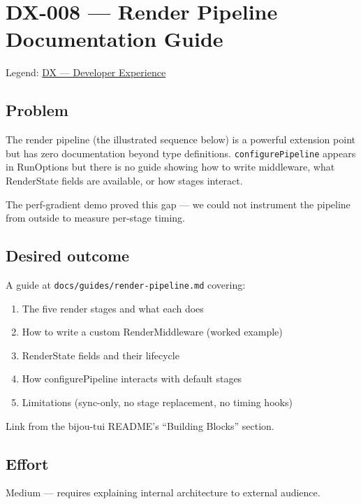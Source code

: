 \chapter{DX-008 --- Render Pipeline Documentation Guide}\label{record-311}

\smallskip

Legend: \href{https://github.com/flyingrobots/bijou/blob/cbd70612140e7a450d764b3c7be1c6af878b99bc/docs/method/graveyard/legends/DX-developer-experience.md}{DX --- Developer Experience}

\section{Problem}\label{record-311-problem}

The render pipeline (the illustrated sequence below) is a powerful extension point but has zero documentation beyond type definitions. \texttt{c\allowbreak{}o\allowbreak{}n\allowbreak{}f\allowbreak{}i\allowbreak{}g\allowbreak{}u\allowbreak{}r\allowbreak{}e\allowbreak{}P\allowbreak{}i\allowbreak{}p\allowbreak{}e\allowbreak{}l\allowbreak{}i\allowbreak{}n\allowbreak{}e} appears in RunOptions but there is no guide showing how to write middleware, what RenderState fields are available, or how stages interact.



The perf-gradient demo proved this gap --- we could not instrument the pipeline from outside to measure per-stage timing.

\section{Desired outcome}\label{record-311-desired-outcome}

A guide at \texttt{d\allowbreak{}o\allowbreak{}c\allowbreak{}s\allowbreak{}/\allowbreak{}g\allowbreak{}u\allowbreak{}i\allowbreak{}d\allowbreak{}e\allowbreak{}s\allowbreak{}/\allowbreak{}r\allowbreak{}e\allowbreak{}n\allowbreak{}d\allowbreak{}e\allowbreak{}r\allowbreak{}-\allowbreak{}p\allowbreak{}i\allowbreak{}p\allowbreak{}e\allowbreak{}l\allowbreak{}i\allowbreak{}n\allowbreak{}e\allowbreak{}.\allowbreak{}m\allowbreak{}d} covering:

\begin{enumerate}
\def\labelenumi{\arabic{enumi}.}
\tightlist
\item
  The five render stages and what each does
\item
  How to write a custom RenderMiddleware (worked example)
\item
  RenderState fields and their lifecycle
\item
  How configurePipeline interacts with default stages
\item
  Limitations (sync-only, no stage replacement, no timing hooks)
\end{enumerate}

Link from the bijou-tui README's ``Building Blocks'' section.

\section{Effort}\label{record-311-effort}

Medium --- requires explaining internal architecture to external audience.

